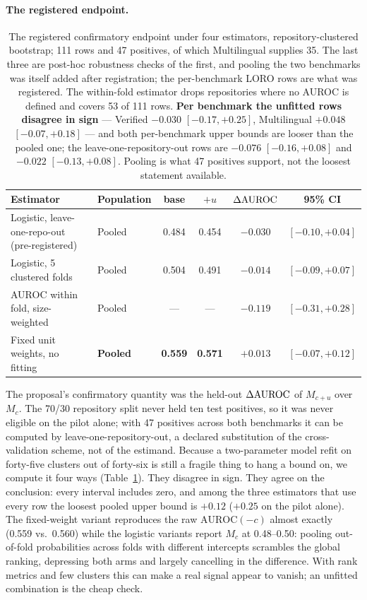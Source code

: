 \documentclass[10pt]{article}
\begin{document}
\paragraph{The registered endpoint.}\label{sec:endpoint}
\begin{table}[t]\centering\footnotesize
\begin{tabular}{llcccc}\toprule
Estimator & Population & base & $+u$ & $\Delta\mathrm{AUROC}$ & 95\% CI \\\midrule
Logistic, leave-one-repo-out (pre-registered) & Pooled & 0.484 & 0.454 & $-0.030$ & $[-0.10, +0.04]$ \\
Logistic, 5 clustered folds & Pooled & 0.504 & 0.491 & $-0.014$ & $[-0.09, +0.07]$ \\
AUROC within fold, size-weighted & Pooled & --- & --- & $-0.119$ & $[-0.31, +0.28]$ \\
Fixed unit weights, no fitting & \textbf{Pooled} & \textbf{0.559} & \textbf{0.571} & $\mathbf{+0.013}$ & $\mathbf{[-0.07, +0.12]}$ \\\bottomrule
\end{tabular}
\caption{The registered confirmatory endpoint under four estimators, repository-clustered bootstrap; 111 rows and 47 positives, of which Multilingual supplies 35. The last three are post-hoc robustness checks of the first, and pooling the two benchmarks was itself added after registration; the per-benchmark LORO rows are what was registered. The within-fold estimator drops repositories where no AUROC is defined and covers 53 of 111 rows. \textbf{Per benchmark the unfitted rows disagree in sign} --- Verified $-0.030$ $[-0.17, +0.25]$, Multilingual $+0.048$ $[-0.07, +0.18]$ --- and both per-benchmark upper bounds are looser than the pooled one; the leave-one-repository-out rows are $-0.076$ $[-0.16, +0.08]$ and $-0.022$ $[-0.13, +0.08]$. Pooling is what 47 positives support, not the loosest statement available.}\label{tab:endpoint}\end{table}
The proposal's confirmatory quantity was the held-out $\Delta\mathrm{AUROC}$ of $M_{c+u}$ over $M_c$. The 70/30 repository split never held ten test positives, so it was never eligible on the pilot alone; with 47 positives across both benchmarks it can be computed by leave-one-repository-out, a declared substitution of the cross-validation scheme, not of the estimand. Because a two-parameter model refit on forty-five clusters out of forty-six is still a fragile thing to hang a bound on, we compute it four ways (Table~\ref{tab:endpoint}). They disagree in sign. They agree on the conclusion: every interval includes zero, and among the three estimators that use every row the loosest pooled upper bound is $+0.12$ ($+0.25$ on the pilot alone). The fixed-weight variant reproduces the raw $\mathrm{AUROC}(-c)$ almost exactly (0.559 vs.\ 0.560) while the logistic variants report $M_c$ at 0.48--0.50: pooling out-of-fold probabilities across folds with different intercepts scrambles the global ranking, depressing both arms and largely cancelling in the difference. With rank metrics and few clusters this can make a real signal appear to vanish; an unfitted combination is the cheap check.
\end{document}
